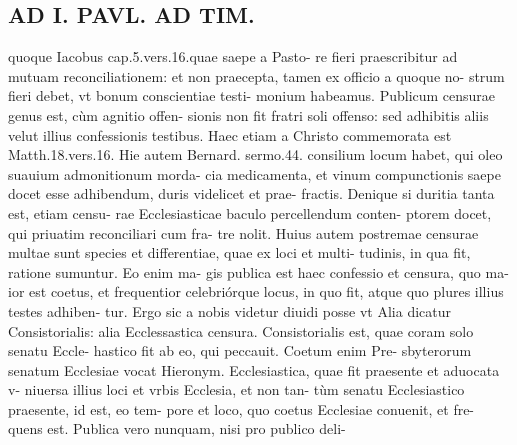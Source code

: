 \documentclass{article}
\begin{document}
\begin{pages}
\section*{AD I. PAVL. AD TIM. }
\marginpar{[ p.320 ]}\pstart quoque Iacobus cap.5.vers.16.quae saepe a Pasto- re fieri praescribitur ad mutuam reconciliationem: et non praecepta, tamen ex officio a quoque no- strum fieri debet, vt bonum conscientiae testi- monium habeamus.  \pend\pstart Publicum censurae genus est, cùm agnitio offen- sionis non fit fratri soli offenso: sed adhibitis aliis velut illius confessionis testibus. Haec etiam a Christo commemorata est Matth.18.vers.16. Hie autem Bernard. sermo.44. consilium locum habet, qui oleo suauium admonitionum morda- cia medicamenta, et vinum compunctionis saepe docet esse adhibendum, duris videlicet et prae- fractis. Denique si duritia tanta est, etiam censu- rae Ecclesiasticae baculo percellendum conten- ptorem docet, qui priuatim reconciliari cum fra- tre nolit. Huius autem postremae censurae multae sunt species et differentiae, quae ex loci et multi- tudinis, in qua fit, ratione sumuntur. Eo enim ma- gis publica est haec confessio et censura, quo ma- ior est coetus, et frequentior celebriórque locus, in quo fit, atque quo plures illius testes adhiben- tur. Ergo sic a nobis videtur diuidi posse vt Alia dicatur Consistorialis: alia Ecclessastica censura. Consistorialis est, quae coram solo senatu Eccle- hastico fit ab eo, qui peccauit. Coetum enim Pre- sbyterorum senatum Ecclesiae vocat Hieronym. Ecclesiastica, quae fit praesente et aduocata v- niuersa illius loci et vrbis Ecclesia, et non tan- tùm senatu Ecclesiastico praesente, id est, eo tem- pore et loco, quo coetus Ecclesiae conuenit, et fre- quens est.  \pend\pstart Publica vero nunquam, nisi pro publico deli-  \pend

\end{pages}
\end{document}

